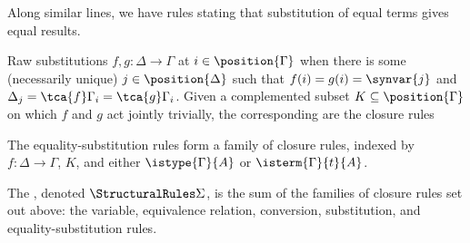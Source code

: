 Along similar lines, we have rules stating that substitution of equal terms gives equal results.
%
\begin{definition}
  \label{def:equality-substitution-rule}%
  Raw substitutions $f, g : \Delta \to \Gamma$  at $i \in \position{\Gamma}$ when there is some (necessarily unique) $j \in \position{\Delta}$ such that $f(i) = g(i) = \synvar{j}$ and $\Delta_j = \tca{f} \Gamma_i = \tca{g} \Gamma_i$.
  Given a complemented subset $K \subseteq \position{\Gamma}$ on which $f$ and $g$ act jointly trivially,
  the corresponding  are the closure rules
  The equality-substitution rules form a family of closure rules, indexed by $f : \Delta \to \Gamma$, $K$, and either $\istype{\Gamma}{A}$ or $\isterm{\Gamma}{t}{A}$.
\end{definition}

\begin{definition}
  \label{def:structural-rules}
  The , denoted $\StructuralRules \Sigma$, is the sum of the families of closure rules set out above: the variable, equivalence relation, conversion, substitution, and equality-substitution rules.
\end{definition}

